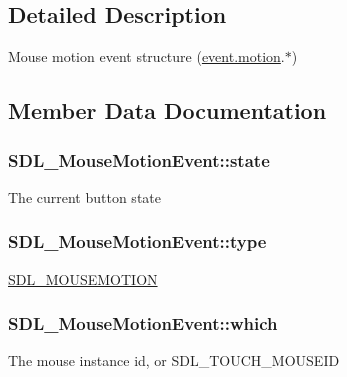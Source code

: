 \subsection{Detailed Description}
Mouse motion event structure (\hyperlink{unionSDL__Event_ac3c89e190faacbe84280cd539453bab6}{event.\+motion}.$\ast$) 

\subsection{Member Data Documentation}
\hypertarget{structSDL__MouseMotionEvent_a3f6e9bad9d959b824881ba09e05b7024}{}
\subsubsection[{state}]{ S\+D\+L\+\_\+\+Mouse\+Motion\+Event\+::state}\label{structSDL__MouseMotionEvent_a3f6e9bad9d959b824881ba09e05b7024}
The current button state \hypertarget{structSDL__MouseMotionEvent_a431dd28cd6db6a7335cf633dbeb80cfb}{}
\subsubsection[{type}]{ S\+D\+L\+\_\+\+Mouse\+Motion\+Event\+::type}\label{structSDL__MouseMotionEvent_a431dd28cd6db6a7335cf633dbeb80cfb}
\hyperlink{SDL__events_8h_a3b589e89be6b35c02e0dd34a55f3fccaa04c436ef80fef38fb77a89e0e9124c30}{S\+D\+L\+\_\+\+M\+O\+U\+S\+E\+M\+O\+T\+I\+O\+N} \hypertarget{structSDL__MouseMotionEvent_a6f04c17b4305683915e2fd2dc3c36dbc}{}
\subsubsection[{which}]{ S\+D\+L\+\_\+\+Mouse\+Motion\+Event\+::which}\label{structSDL__MouseMotionEvent_a6f04c17b4305683915e2fd2dc3c36dbc}
The mouse instance id, or S\+D\+L\+\_\+\+T\+O\+U\+C\+H\+\_\+\+M\+O\+U\+S\+E\+I\+D \hypertarget{structSDL__MouseMotionEvent_aa9976725242ada93a9e18e7fdf5796e6}{}
